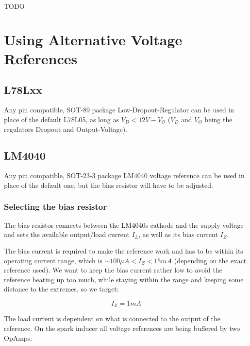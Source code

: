 \documentclass[12pt, a4paper]{article}
\begin{document}
TODO

\section*{Using Alternative Voltage References}

\subsection*{L78Lxx}

Any pin compatible, SOT-89 package Low-Dropout-Regulator can be used in place of the
default L78L05, as long as \enspace $V_D < 12V - V_O$ \enspace ($V_D$ and $V_O$ being the
regulators Dropout and Output-Voltage).

\subsection*{LM4040}

Any pin compatible, SOT-23-3 package LM4040 voltage reference can be used in place of the
default one, but the bias resistor will have to be adjusted.

\subsubsection*{Selecting the bias resistor}
\label{ssec:appendix_lm4040_selecting_bias_resistor}

The bias resistor connects between the LM4040s cathode and the supply voltage and sets the
available output/load current $I_L$, as well as its bias current $I_Z$.

The bias current is required to make the reference work and has to be within its operating
current range, which is \enspace $\sim \!\! 100\mu A < I_Z < 15mA $ \enspace
(depending on the exact reference used). We want to keep the bias current rather low to avoid
the reference heating up too much, while staying within the range and keeping some distance to
the extremes, so we target:

\[ I_Z = 1mA \tag*{$(a)$}\label{tag:a} \]

The load current is dependent on what is connected to the output of the reference. On the
spark inducer all voltage references are being buffered by two OpAmps:
\end{document}
